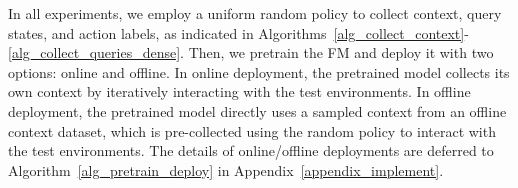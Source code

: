 

            

%
%





In all experiments, we employ a uniform random policy to collect context, query states, and action labels, as indicated in Algorithms~\ref{alg_collect_context}-\ref{alg_collect_queries_dense}.
%
Then, we pretrain the FM and deploy it with two options: online and offline. In online deployment, the pretrained model collects its own context by iteratively interacting with the test environments. In offline deployment, the pretrained model directly uses a sampled context from an offline context dataset, which is pre-collected using the random policy to interact with the test environments. The details of online/offline deployments are deferred to Algorithm~\ref{alg_pretrain_deploy} in Appendix~\ref{appendix_implement}.





